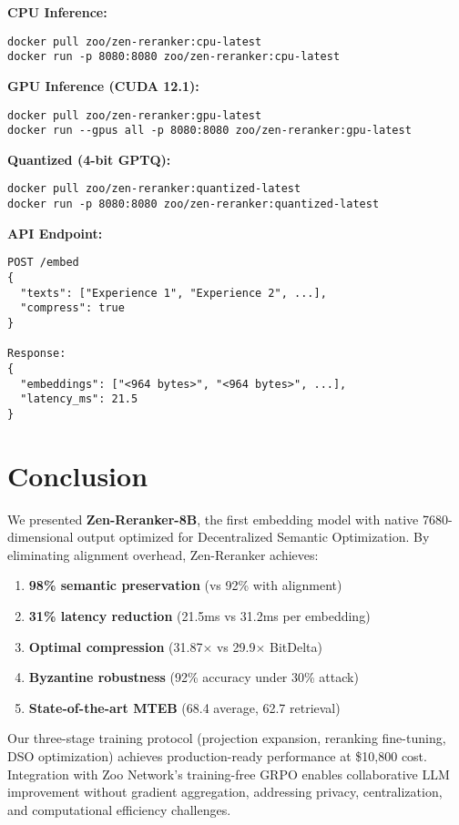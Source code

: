 \documentclass[11pt,a4paper]{article}
\begin{document}
\textbf{CPU Inference:}
\begin{verbatim}
docker pull zoo/zen-reranker:cpu-latest
docker run -p 8080:8080 zoo/zen-reranker:cpu-latest
\end{verbatim}

\textbf{GPU Inference (CUDA 12.1):}
\begin{verbatim}
docker pull zoo/zen-reranker:gpu-latest
docker run --gpus all -p 8080:8080 zoo/zen-reranker:gpu-latest
\end{verbatim}

\textbf{Quantized (4-bit GPTQ):}
\begin{verbatim}
docker pull zoo/zen-reranker:quantized-latest
docker run -p 8080:8080 zoo/zen-reranker:quantized-latest
\end{verbatim}

\textbf{API Endpoint:}
\begin{verbatim}
POST /embed
{
  "texts": ["Experience 1", "Experience 2", ...],
  "compress": true
}

Response:
{
  "embeddings": ["<964 bytes>", "<964 bytes>", ...],
  "latency_ms": 21.5
}
\end{verbatim}

\section{Conclusion}

We presented \textbf{Zen-Reranker-8B}, the first embedding model with native 7680-dimensional output optimized for Decentralized Semantic Optimization. By eliminating alignment overhead, Zen-Reranker achieves:

\begin{enumerate}
\item \textbf{98\% semantic preservation} (vs 92\% with alignment)
\item \textbf{31\% latency reduction} (21.5ms vs 31.2ms per embedding)
\item \textbf{Optimal compression} (31.87$\times$ vs 29.9$\times$ BitDelta)
\item \textbf{Byzantine robustness} (92\% accuracy under 30\% attack)
\item \textbf{State-of-the-art MTEB} (68.4 average, 62.7 retrieval)
\end{enumerate}

Our three-stage training protocol (projection expansion, reranking fine-tuning, DSO optimization) achieves production-ready performance at \$10,800 cost. Integration with Zoo Network's training-free GRPO enables collaborative LLM improvement without gradient aggregation, addressing privacy, centralization, and computational efficiency challenges.
\end{document}

